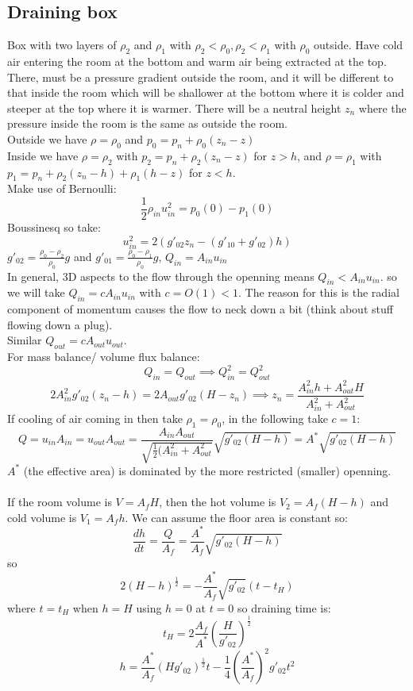 \documentclass{article}
\begin{document}
\subsection{Draining box}
Box with two layers of $\rho_2$ and $\rho_1$  with $\rho_2 < \rho_0, \rho_2 < \rho_1$ with $\rho_0$ outside. Have cold air entering the room at the bottom and warm air being extracted at the top. There, must be a pressure gradient outside the room, and it will be different to that inside the room which will be shallower at the bottom where it is colder and steeper at the top where it is warmer. There will be a neutral height $z_n$ where the pressure inside the room is the same as outside the room.\\
Outside we have $\rho= \rho_0$ and $p_0 = p_n + \rho_0( z_n - z)$\\
Inside we have $\rho= \rho_2$ with $p_2 = p_n + \rho_2( z_n - z)$ for $z > h$, and $\rho= \rho_1$ with $p_1 = p_n + \rho_2( z_n - h) + \rho_1 ( h -z)$ for $z < h$.\\
Make use of Bernoulli:
$$
\frac{1}{2} \rho_{in} u_{in}^2 = p_0(0) - p_1(0)
$$
Boussinesq so take:
$$
u_{in}^2 = 2( g'_{02} z_n - ( g'_{10} + g'_{02}) h)
$$
$g'_{02} = \frac{\rho_0 - \rho_2}{\rho_0} g$ and $g'_{01} = \frac{\rho_0 - \rho_1}{\rho_0} g$, $Q_{in} = A_{in} u_{in}$\\
In general, 3D aspects to the flow through the openning means $Q_{in} < A_{in} u_{in}$. so we will take $Q_{in} = c A_{in} u_{in}$ with $c = O(1) <1$. The reason for this is the radial component of momentum causes the flow to neck down a bit (think about stuff flowing down a plug).\\
Similar $Q_{out} = c A_{out} u_{out}$.\\
For mass balance/ volume flux balance:
$$
Q_{in} = Q_{out} \implies Q_{in}^2 = Q_{out}^2
$$
$$
2 A_{in}^2 g'_{02} ( z_n - h) = 2 A_{out} g'_{02} (H - z_n) \implies z_n = \frac{A_{in}^2 h + A_{out}^2 H}{A_{in}^2 + A_{out}^2}
$$
If cooling of air coming in then take $\rho_1 = \rho_0$, in the following take $c=1$:
$$
Q = u_{in} A_{in} = u_{out} A_{out} = \frac{A_{in} A_{out}}{\sqrt{\frac{1}{2} ( A_{in}^2 + A_{out}^2}} \sqrt{g'_{02} (H-h)} = A^* \sqrt{ g'_{02} (H - h)}
$$
$A^*$ (the effective area) is dominated by the more restricted (smaller) openning.\\\\
If the room volume is $V = A_f H$, then the hot volume is $V_2 = A_f( H-h)$ and cold volume is $V_1= A_f h$. We can assume the floor area is constant so:
$$
 \frac{dh}{dt} = \frac{Q}{A_f} = \frac{A^*}{A_f} \sqrt{g'_{02} (H-h)}
$$
so
$$
 2(H-h)^{\frac{1}{2}} = - \frac{A^*}{A_f} \sqrt{g'_{02}} ( t - t_H)
$$
where $t=t_H$ when $h=H$ using $h=0$ at $t=0$ so draining time is:
$$
 t_H = 2 \frac{A_f}{A^*} ( \frac{H}{g'_{02}})^{\frac{1}{2}}
$$
$$
h = \frac{A^*}{A_f}( H g'_{02})^{\frac{1}{2}}t - \frac{1}{4} ( \frac{A^*}{A_f})^2 g'_{02} t^2
$$
\end{document}
